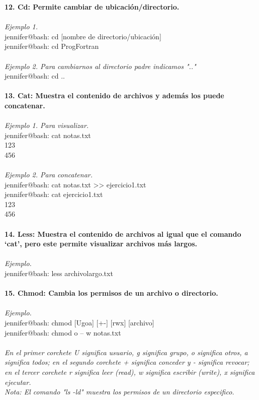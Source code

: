 \documentclass{article}
\begin{document}
\textbf{12. Cd: Permite cambiar de ubicación/directorio.}
\\\\\textit{Ejemplo 1.}
\\jennifer@bash: cd [nombre de directorio/ubicación]
\\jennifer@bash: cd ProgFortran
\\\\\textit{Ejemplo 2. Para cambiarnos al directorio padre indicamos ".."}
\\jennifer@bash: cd ..
\\ \\
\textbf{13. Cat: Muestra el contenido de archivos y además los puede concatenar.}
\\\\\textit{Ejemplo 1. Para visualizar.}
\\jennifer@bash: cat notas.txt
\\123
\\456
\\\\\textit{Ejemplo 2. Para concatenar.}
\\jennifer@bash: cat notas.txt >> ejercicio1.txt
\\jennifer@bash: cat ejercicio1.txt
\\123
\\456
\\\\
\textbf{14. Less: Muestra el contenido de archivos al igual que el comando ‘cat’, pero este permite visualizar archivos más largos.}
\\\\\textit{Ejemplo.}
\\jennifer@bash: less archivolargo.txt
\\\\
\textbf{15. Chmod: Cambia los permisos de un archivo o directorio.}
\\\\\textit{Ejemplo.}
\\jennifer@bash: chmod [Ugoa] [+-] [rwx] [archivo]
\\jennifer@bash: chmod o – w notas.txt
\\\\\textit{En el primer corchete U significa usuario, g significa grupo, o significa otros, a significa todos; en el segundo corchete + significa conceder y - significa revocar; en el tercer corchete r significa leer (read), w significa escribir (write), x significa ejecutar.}
\\\textit{Nota: El comando "ls -ld" muestra los permisos de un directorio especifico.}
\end{document}
